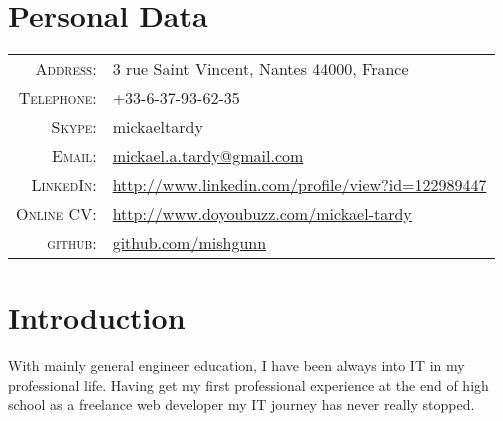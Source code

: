 \documentclass[letter,10pt]{article} %
\begin{document}
\pagestyle{empty} %



\par{\par} %
\par{\bigskip\par} %

\section{Personal Data}

\begin{tabular}{rl}
\textsc{Address:} & 3 rue Saint Vincent, Nantes  44000, France \\
\textsc{Telephone:} & +33-6-37-93-62-35\\
\textsc{Skype:} & mickaeltardy\\
\textsc{Email:} &
\href{mailto:mickael.a.tardy@gmail.com}{mickael.a.tardy@gmail.com} \\
\textsc{LinkedIn:} &
\href{http://www.linkedin.com/profile/view?id=122989447}{http://www.linkedin.com/profile/view?id=122989447}
\\
\textsc{Online CV:} &
\href{http://www.doyoubuzz.com/mickael-tardy}{http://www.doyoubuzz.com/mickael-tardy}
\\ 
\textsc{github:} & \href{https://github.com/mishgunn}{github.com/mishgunn}
\end{tabular}


\section{Introduction}

With mainly general engineer education, I have been always into IT in my
professional life. Having get my first professional experience at the end of
high school as a freelance web developer my IT journey has never really stopped. 
\end{document}
